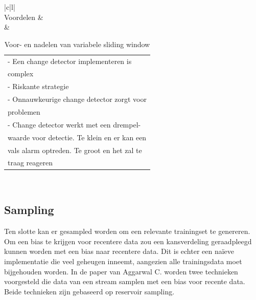 \begin{table}[!ht]
\begin{tabular}{|c|l|}
\hline
{} \\ \hline
Voordelen &  \\ \hline
{} & \begin{tabular}[c]{@{}l@{}}- Een change detector implementeren is \\ \phantom{-} complex\\ - Riskante strategie\\ - Onnauwkeurige change detector zorgt voor\\ \phantom{-} problemen\\ - Change detector werkt met een drempel-\\\phantom{-} waarde voor detectie. Te klein en er kan een \\ \phantom{-} vals alarm optreden. Te groot en het zal te \\ \phantom{-} traag reageren\end{tabular} \\ \hline
\end{tabular}
\caption{Voor- en nadelen van variabele sliding window}
\label{tab:voor- en nadelen van variabele sliding window}
\end{table}
\newpage
\subsection{Sampling}
Ten slotte kan er gesampled worden om een relevante trainingset te genereren. Om een bias te krijgen voor recentere data zou een kansverdeling geraadpleegd kunnen worden met een bias naar recentere data. Dit is echter een naïeve implementatie die veel geheugen inneemt, aangezien alle trainingsdata moet bijgehouden worden. In de paper van Aggarwal C. \cite{biased reservoir sampling} worden twee technieken voorgesteld die data van een stream samplen met een bias voor recente data. Beide technieken zijn gebaseerd op reservoir sampling.

